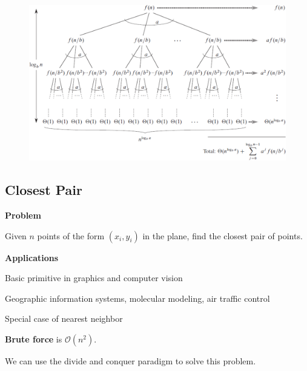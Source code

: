 \begin{figure}[ht!]
    \centering

    \includegraphics[width=\linewidth]{figures/master-theorem.png}
\end{figure}

\subsection{Closest Pair}

\begin{listu}
    \item \textbf{Problem}
    
    Given $n$ points of the form $(x_i, y_i)$ in the plane, find the closest pair of points.

    \item \textbf{Applications}
    
    \begin{listu}
        \item Basic primitive in graphics and computer vision
        \item Geographic information systems, molecular modeling, air traffic control
        \item Special case of nearest neighbor
    \end{listu}

    \item \textbf{Brute force} is $\mathcal{O}(n^2)$.
\end{listu}

We can use the divide and conquer paradigm to solve this problem.

